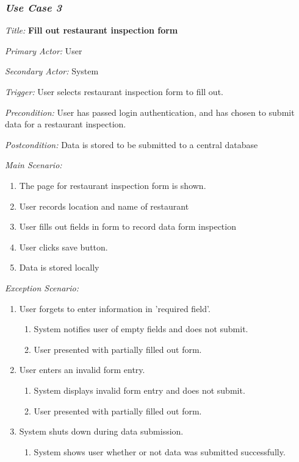 \documentclass[twoside,letterpaper]{article}
\begin{document}
\subsubsection{\textit{Use Case 3}}

\textit{Title: }{\bfseries\color{black} Fill out restaurant inspection form}

{\color{black} \textit{Primary Actor:} User}

{\color{black} \textit{Secondary Actor:} System}

{\color{black} \textit{Trigger:} User selects restaurant inspection form to fill out.}

{\color{black} \textit{Precondition:} User has passed login authentication, and has chosen to submit data for a restaurant inspection.}

{\color{black} \textit{Postcondition:}  Data is stored to be submitted to a central database}
\newline

{\color{black} \textit{Main Scenario:}}
\begin{enumerate}
\item The page for restaurant inspection form is shown.
\item User records location and name of restaurant
\item User fills out fields in form to record data form inspection
\item User clicks save button.
\item Data is stored locally
\end{enumerate}

{\color{black} \textit{Exception Scenario:}}
\begin{enumerate}
\item User forgets to enter information in 'required field'.
\begin{enumerate}
\item System notifies user of empty fields and does not submit.
\item User presented with partially filled out form.
\end{enumerate}

\item User enters an invalid form entry.
\begin{enumerate}
\item System displays invalid form entry and does not submit.
\item User presented with partially filled out form.
\end{enumerate}

\item System shuts down during data submission.
\begin{enumerate}
\item System shows user whether or not data was submitted successfully. 
\end{enumerate}
\end{enumerate}
\end{document}
